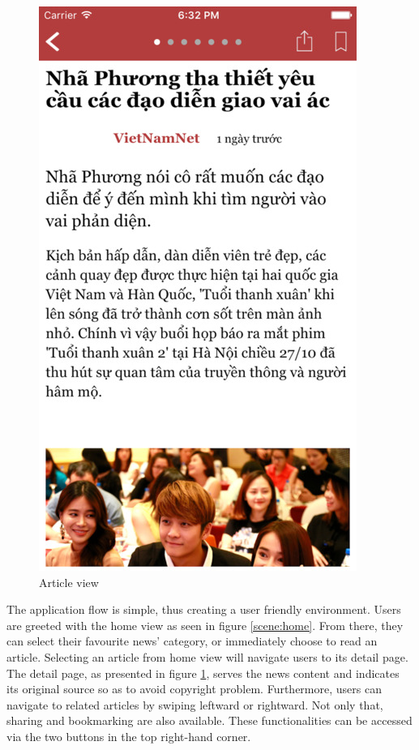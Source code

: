 \documentclass[11pt,a4paper,oneside,article]{memoir}
\begin{document}
\begin{figure}[!htb]
\begin {minipage}{0.48\textwidth}
     \includegraphics[width=.8\linewidth]{web-scene}
     \caption{Article view}\label{scene:detail}
   \end{minipage}
\end{figure}

The application flow is simple, thus creating a user friendly environment. Users are greeted with the home view as seen in figure \ref{scene:home}. From there, they can select their favourite news' category, or immediately choose to read an article. Selecting an article from home view will navigate users to its detail page. The detail page, as presented in figure \ref{scene:detail}, serves the news content and indicates its original source so as to avoid copyright problem. Furthermore, users can navigate to related articles by swiping leftward or rightward. Not only that, sharing and bookmarking are also available. These functionalities can be accessed via the two buttons in the top right-hand corner.
\end{document}
